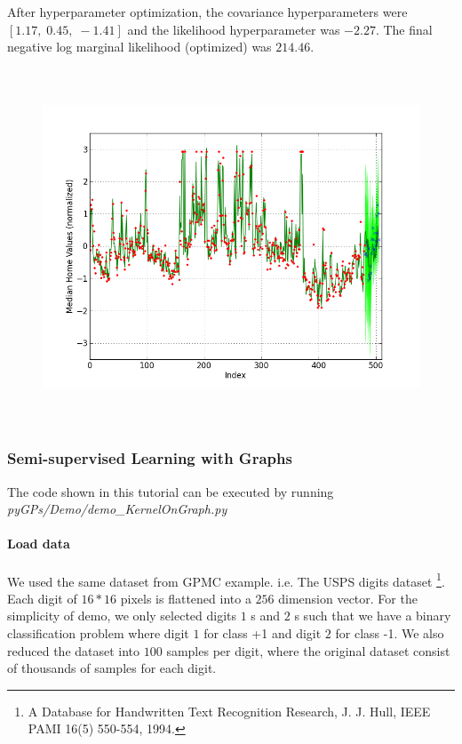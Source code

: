\documentclass[letterpaper,10pt,english]{sphinxmanual}
\begin{document}
After hyperparameter optimization, the covariance hyperparameters were $[ 1.17, \;  0.45, \; -1.41 ]$ and the likelihood
hyperparameter was $-2.27$.  The final negative log marginal likelihood (optimized) was  $214.46$.
\begin{figure}[htbp]
\centering

\includegraphics[width=600pt,height=300pt]{_images/demoH2.png}
\end{figure}


\subsubsection{Semi-supervised Learning with Graphs}
\label{SemiSupervised:semi-supervised-learning-with-graphs}\label{SemiSupervised::doc}
The code shown in this tutorial can be executed by running \emph{pyGPs/Demo/demo\_KernelOnGraph.py}


\paragraph{Load data}
\label{SemiSupervised:load-data}
We used the same dataset from GPMC example. i.e. The USPS digits dataset \footnote{
A Database for Handwritten Text Recognition Research, J. J. Hull, IEEE PAMI 16(5) 550-554, 1994.
}.
Each digit of $16*16$ pixels is flattened into a $256$ dimension vector.
For the simplicity of demo, we only selected digits $1$ s and $2$ s such that we have a binary classification problem where digit $1$ for class +1 and digit $2$ for class -1. We also reduced the dataset into $100$ samples per digit, where the original dataset consist of thousands of samples for each digit.
\end{document}
